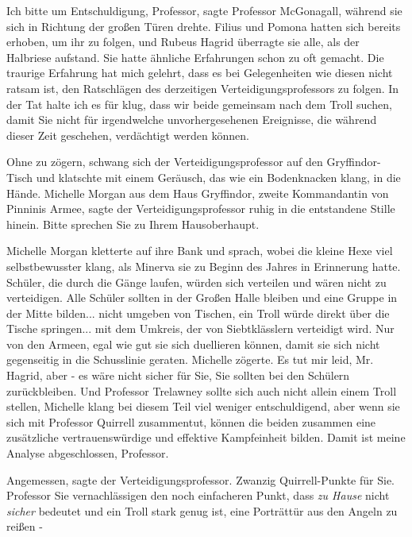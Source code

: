 \glqq Ich bitte um Entschuldigung, Professor\grqq{}, sagte Professor McGonagall,
während sie sich in Richtung der großen Türen drehte. Filius und Pomona hatten
sich bereits erhoben, um ihr zu folgen, und Rubeus Hagrid überragte sie alle,
als der Halbriese aufstand. Sie hatte ähnliche Erfahrungen schon zu oft gemacht.
\glqq Die traurige Erfahrung hat mich gelehrt, dass es bei Gelegenheiten wie
diesen nicht ratsam ist, den Ratschlägen des derzeitigen Verteidigungsprofessors
zu folgen. In der Tat halte ich es für klug, dass wir beide gemeinsam nach dem
Troll suchen, damit Sie nicht für irgendwelche unvorhergesehenen Ereignisse, die
während dieser Zeit geschehen, verdächtigt werden können.\grqq{}

Ohne zu zögern, schwang sich der Verteidigungsprofessor auf den Gryffindor-Tisch
und klatschte mit einem Geräusch, das wie ein Bodenknacken klang, in die Hände.
\glqq Michelle Morgan aus dem Haus Gryffindor, zweite Kommandantin von Pinninis
Armee\grqq{}, sagte der Verteidigungsprofessor ruhig in die entstandene Stille
hinein. \glqq Bitte sprechen Sie zu Ihrem Hausoberhaupt.\grqq{}

Michelle Morgan kletterte auf ihre Bank und sprach, wobei die kleine Hexe viel
selbstbewusster klang, als Minerva sie zu Beginn des Jahres in Erinnerung hatte.
\glqq Schüler, die durch die Gänge laufen, würden sich verteilen und wären nicht
zu verteidigen. Alle Schüler sollten in der Großen Halle bleiben und eine Gruppe
in der Mitte bilden... nicht umgeben von Tischen, ein Troll würde direkt über
die Tische springen... mit dem Umkreis, der von Siebtklässlern verteidigt wird.
Nur von den Armeen, egal wie gut sie sich duellieren können, damit sie sich
nicht gegenseitig in die Schusslinie geraten.\grqq{} Michelle zögerte. \glqq Es
tut mir leid, Mr. Hagrid, aber - es wäre nicht sicher für Sie, Sie sollten bei
den Schülern zurückbleiben. Und Professor Trelawney sollte sich auch nicht
allein einem Troll stellen\grqq{}, Michelle klang bei diesem Teil viel weniger
entschuldigend, \glqq aber wenn sie sich mit Professor Quirrell zusammentut,
können die beiden zusammen eine zusätzliche vertrauenswürdige und effektive
Kampfeinheit bilden. Damit ist meine Analyse abgeschlossen, Professor.\grqq{}

\glqq Angemessen\grqq{}, sagte der Verteidigungsprofessor. \glqq Zwanzig
Quirrell-Punkte für Sie. Professor Sie vernachlässigen den noch einfacheren
Punkt, dass \emph{zu Hause} nicht \emph{sicher} bedeutet und ein Troll stark
genug ist, eine Porträttür aus den Angeln zu reißen -\grqq{}

